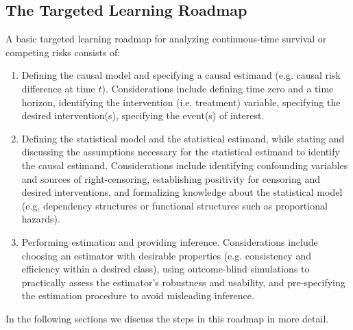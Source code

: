\documentclass{report}
\newcommand{\1}{\ensuremath{\mathbf{1}}}
\begin{document}
\subsection{The Targeted Learning Roadmap}
\label{sec:orgc11b1ac}
A basic targeted learning roadmap for analyzing continuous-time survival or competing risks consists of:
\begin{enumerate}
  \item Defining the causal model and specifying a causal estimand (e.g. causal risk difference at time $t$). Considerations include defining time zero and a time horizon, identifying the intervention (i.e. treatment) variable, specifying the desired intervention(s), specifying the event(s) of interest.
  \item Defining the statistical model and the statistical estimand, while stating and discussing the assumptions necessary for the statistical estimand to identify the causal estimand. Considerations include identifying confounding variables and sources of right-censoring, establishing positivity for censoring and desired interventions, and formalizing knowledge about the statistical model (e.g. dependency structures or functional structures such as proportional hazards).
  \item Performing estimation and providing inference. Considerations include choosing an estimator with desirable properties (e.g. consistency and efficiency within a desired class), using outcome-blind simulations to practically assess the estimator's robustness and usability, and pre-specifying the estimation procedure to avoid misleading inference.
\end{enumerate}

In the following sections we discuss the steps in this roadmap in more detail.
\end{document}
